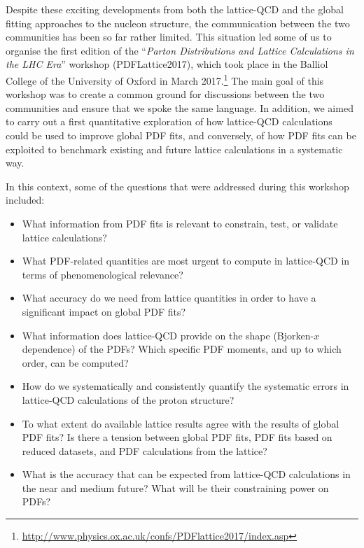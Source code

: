 Despite these exciting developments from both the lattice-QCD
and the global fitting approaches to
the nucleon structure, the communication between the
two communities has been so far rather limited.
%
This situation led some of us
to organise the first edition of the
``{\it Parton Distributions and Lattice Calculations in the LHC Era}''
workshop (PDFLattice2017), which took
place in the Balliol College of the University of Oxford in March
2017.\footnote{\url{http://www.physics.ox.ac.uk/confs/PDFlattice2017/index.asp}}
%
The main goal of this workshop was to create a common ground for discussions
between the two communities and ensure that we spoke the same language.
%
In addition, we aimed to carry out a first quantitative exploration
of how lattice-QCD calculations 
could be used to improve global PDF fits, and conversely, of how PDF fits 
can be exploited to benchmark existing and future lattice calculations 
in a systematic way.

In this context, some of the questions that were addressed during this workshop
included:
\begin{itemize}
\item What information from PDF fits is relevant to constrain, 
  test, or validate lattice calculations?

\item What PDF-related quantities are most urgent
  to compute in lattice-QCD in terms of phenomenological relevance?

\item What accuracy do we need from lattice quantities 
  in order to have a significant impact on global PDF fits?

\item What information does lattice-QCD provide on the
  shape (Bjorken-$x$ dependence) of the PDFs? Which specific
  PDF moments, and up to which order, can be computed?
  
\item How do we systematically and consistently quantify the systematic errors 
in  lattice-QCD calculations of the proton structure?

\item To what extent do available lattice results agree with the results of
  global PDF fits? Is there a tension between global PDF fits, PDF
  fits based on reduced datasets, and PDF calculations from the lattice?

\item What is the accuracy that can be expected from lattice-QCD
  calculations in the near and medium future? What will be their
  constraining power on PDFs?

\end{itemize}


